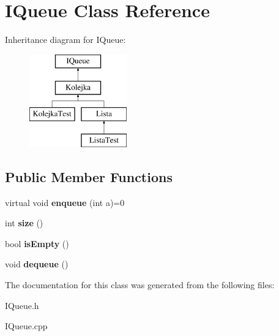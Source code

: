 \hypertarget{class_i_queue}{\section{I\-Queue Class Reference}
\label{class_i_queue}
}
Inheritance diagram for I\-Queue\-:\begin{figure}[H]
\begin{center}
\leavevmode
\includegraphics[height=4.000000cm]{class_i_queue}
\end{center}
\end{figure}
\subsection*{Public Member Functions}
\begin{DoxyCompactItemize}
\item 
\hypertarget{class_i_queue_ac751567102d944b59366acaece0ca639}{virtual void {\bfseries enqueue} (int a)=0}\label{class_i_queue_ac751567102d944b59366acaece0ca639}

\item 
\hypertarget{class_i_queue_a99998d398d9e13ebbf47596c1d9cc9f3}{int {\bfseries size} ()}\label{class_i_queue_a99998d398d9e13ebbf47596c1d9cc9f3}

\item 
\hypertarget{class_i_queue_a243ebb1847cb1210d8d7e32b6b602bdb}{bool {\bfseries is\-Empty} ()}\label{class_i_queue_a243ebb1847cb1210d8d7e32b6b602bdb}

\item 
\hypertarget{class_i_queue_a3d2dbf94af124d9c74e88f862b25ee31}{void {\bfseries dequeue} ()}\label{class_i_queue_a3d2dbf94af124d9c74e88f862b25ee31}

\end{DoxyCompactItemize}


The documentation for this class was generated from the following files\-:\begin{DoxyCompactItemize}
\item 
I\-Queue.\-h\item 
I\-Queue.\-cpp\end{DoxyCompactItemize}
